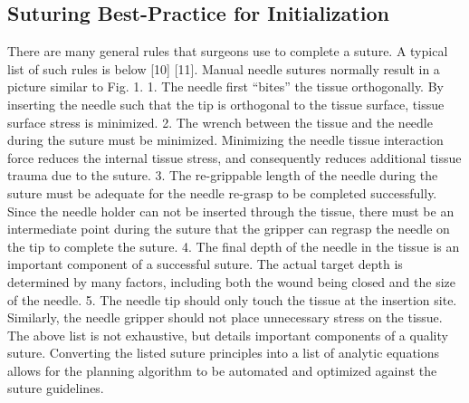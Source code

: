 \documentclass[0-suturing.tex]{subfiles}
\begin{document}
\subsection{Suturing Best-Practice for Initialization}
There are many general rules that surgeons use to complete
a suture. A typical list of such rules is below [10] [11].
Manual needle sutures normally result in a picture similar to
Fig. 1.
1. The needle first “bites” the tissue orthogonally. By
inserting the needle such that the tip is orthogonal to
the tissue surface, tissue surface stress is minimized.
2. The wrench between the tissue and the needle during
the suture must be minimized. Minimizing the needle
tissue interaction force reduces the internal tissue stress,
and consequently reduces additional tissue trauma due
to the suture.
3. The re-grippable length of the needle during the
suture must be adequate for the needle re-grasp to be
completed successfully. Since the needle holder can
not be inserted through the tissue, there must be an
intermediate point during the suture that the gripper can
regrasp the needle on the tip to complete the suture.
4. The final depth of the needle in the tissue is an
important component of a successful suture. The actual
target depth is determined by many factors, including
both the wound being closed and the size of the needle.
5. The needle tip should only touch the tissue at the
insertion site. Similarly, the needle gripper should not
place unnecessary stress on the tissue.
The above list is not exhaustive, but details important components
of a quality suture.
Converting the listed suture principles into a list of analytic
equations allows for the planning algorithm to be automated
and optimized against the suture guidelines.
\end{document}
